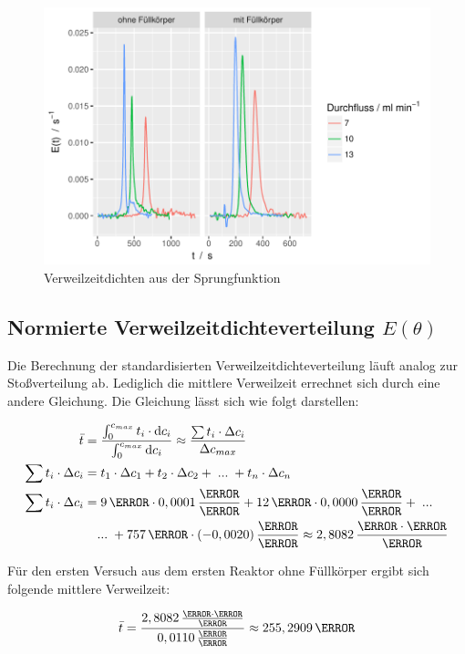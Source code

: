\documentclass[12pt,liststotoc]{report}
\begin{document}
\begin{figure}[H]
\centering
\includegraphics[width=1\textwidth]{Graphics/E_step.pdf}
\caption[Verweilzeitdichte Sprungfunktion]{Verweilzeitdichten aus der Sprungfunktion}
\label{dichte_step}
\end{figure}
\noindent

\subsection{Normierte Verweilzeitdichteverteilung $E(\theta)$}

Die Berechnung der standardisierten Verweilzeitdichteverteilung läuft analog zur Stoßverteilung ab. Lediglich die mittlere Verweilzeit errechnet sich durch eine andere Gleichung. Die Gleichung lässt sich wie folgt darstellen:

\begin{align}
\bar{t}=&\; \frac{\int_{0}^{c_{max}}t_i \cdot\text{d}c_i}{\int_{0}^{c_{max}}\text{d}c_i}\approx \frac{\sum t_i\cdot\Delta c_i}{\Delta c_{max}}\\
\sum t_i\cdot\Delta c_i =&\; t_1\cdot\Delta c_1 + t_2\cdot\Delta c_2+\;...\;+t_n\cdot\Delta c_n\\
\sum t_i\cdot\Delta c_i =&\; 9\,\s\cdot0,0001\,\frac{\mole}{\litre}  + 12\,\s\cdot 0,0000\,\frac{\mole}{\litre}+\;...\notag\\
&...\;+757\,\s\cdot (-0,0020)\,\frac{\mole}{\litre}\approx 2,8082\,\frac{\mole\cdot\s}{\litre} \notag
\end{align}

Für den ersten Versuch aus dem ersten Reaktor ohne Füllkörper ergibt sich folgende mittlere Verweilzeit:

\begin{equation}
\bar{t}= \frac{2,8082\,\frac{\mole\cdot\s}{\litre}}{0,0110\,\frac{\mole}{\litre}} \approx 255,2909\,\s\notag
\end{equation}
\end{document}
